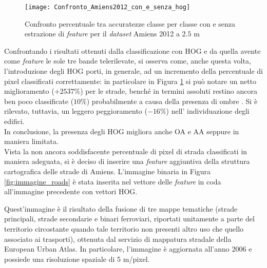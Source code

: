 \begin{figure}[!ht]

\texttt{[image: Confronto\_Amiens2012\_con\_e\_senza\_hog]}

\caption{Confronto percentuale tra accuratezze classe per classe con e
senza estrazione di \emph{feature} per il \emph{dataset} Amiens 2012 a
$2.5$ m}

\label{fig:Confronto_Amiens2012_2.5m}

\end{figure}

Confrontando i risultati ottenuti dalla classificazione con HOG e da
quella avente come \emph{feature} le sole tre bande telerilevate, si
osserva come, anche questa volta, l'introduzione degli HOG porti, in
generale, ad un incremento della percentuale di pixel classificati
correttamente: in particolare in Figura
\ref{fig:Confronto_Amiens2012_2.5m} si può notare un netto
miglioramento ($+2537\%$) per le strade, benché in termini assoluti
restino ancora ben poco classificate ($10\%$) probabilmente a causa
della presenza di ombre . Si è rilevato, tuttavia, un leggero
peggioramento ($-16\%$) nell' individuazione degli edifici. \\ In
conclusione, la presenza degli HOG migliora anche OA e AA seppure in
maniera limitata. \\

Vista la non ancora soddisfacente percentuale di pixel di strada
classificati in maniera adeguata, si è deciso di inserire una
\emph{feature} aggiuntiva della struttura cartografica delle strade di
Amiens. L'immagine binaria in Figura \ref{fig:immagine_roads} è stata
inserita nel vettore delle \emph{feature} in coda all'immagine
precedente con vettori HOG.

Quest'immagine è il risultato della fusione di tre mappe tematiche
(strade principali, strade secondarie e binari ferroviari, riportati
unitamente a parte del territorio circostante quando tale territorio
non presenti altro uso che quello associato ai trasporti), ottenuta
dal servizio di mappatura stradale della European Urban Atlas. In
particolare, l'immagine è aggiornata all'anno $2006$ e possiede una
risoluzione spaziale di 5 m/pixel.

%
%
%
%
%

